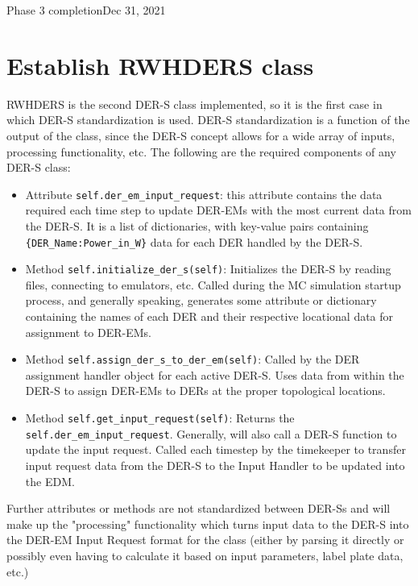 \begin{entry}{Phase 3 completion}{Dec 31, 2021}
    \section*{Establish RWHDERS class}
    RWHDERS is the second DER-S class implemented, so it is the first case in which DER-S standardization is used. DER-S
    standardization is a function of the output of the class, since the DER-S concept allows for a wide array of inputs,
    processing functionality, etc. The following are the required components of any DER-S class:
    \begin{itemize}
        \item Attribute \verb|self.der_em_input_request|: this attribute contains the data required each time step to
            update DER-EMs with the most current data from the DER-S. It is a list of dictionaries, with key-value pairs
            containing \verb|{DER_Name:Power_in_W}| data for each DER handled by the DER-S.
        \item Method \verb|self.initialize_der_s(self)|: Initializes the DER-S by reading files, connecting to emulators,
            etc. Called during the MC simulation startup process, and generally speaking, generates some attribute or
            dictionary containing the names of each DER and their respective locational data for assignment to DER-EMs.
        \item Method \verb|self.assign_der_s_to_der_em(self)|: Called by the DER assignment handler object for each
            active DER-S. Uses data from within the DER-S to assign DER-EMs to DERs at the proper topological locations.
        \item Method \verb|self.get_input_request(self)|: Returns the \verb|self.der_em_input_request|. Generally, will
            also call a DER-S function to update the input request. Called each timestep by the timekeeper to transfer
            input request data from the DER-S to the Input Handler to be updated into the EDM.
    \end{itemize}
    Further attributes or methods are not standardized between DER-Ss and will make up the "processing" functionality
    which turns input data to the DER-S into the DER-EM Input Request format for the class (either by parsing it directly
    or possibly even having to calculate it based on input parameters, label plate data, etc.)


\end{entry}

